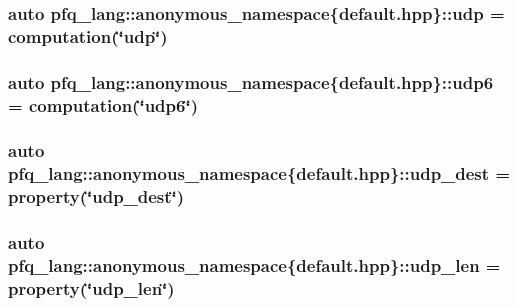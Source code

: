 \hypertarget{namespacepfq__lang_1_1anonymous__namespace_02default_8hpp_03_a1f18de2040dd9d74a07b1c535911abdf}{
\subsubsection[{udp}]{\setlength{\rightskip}{0pt plus 5cm}auto pfq\-\_\-lang\-::anonymous\-\_\-namespace\{default.\-hpp\}\-::udp = {\bf computation}(\char`\"{}udp\char`\"{})}}\label{namespacepfq__lang_1_1anonymous__namespace_02default_8hpp_03_a1f18de2040dd9d74a07b1c535911abdf}
\hypertarget{namespacepfq__lang_1_1anonymous__namespace_02default_8hpp_03_a84b7a888d00d5dfea606f7df96ba0ad3}{
\subsubsection[{udp6}]{\setlength{\rightskip}{0pt plus 5cm}auto pfq\-\_\-lang\-::anonymous\-\_\-namespace\{default.\-hpp\}\-::udp6 = {\bf computation}(\char`\"{}udp6\char`\"{})}}\label{namespacepfq__lang_1_1anonymous__namespace_02default_8hpp_03_a84b7a888d00d5dfea606f7df96ba0ad3}
\hypertarget{namespacepfq__lang_1_1anonymous__namespace_02default_8hpp_03_a4f869214bea58f5ed42b3faded5ab088}{
\subsubsection[{udp\-\_\-dest}]{\setlength{\rightskip}{0pt plus 5cm}auto pfq\-\_\-lang\-::anonymous\-\_\-namespace\{default.\-hpp\}\-::udp\-\_\-dest = {\bf property}(\char`\"{}udp\-\_\-dest\char`\"{})}}\label{namespacepfq__lang_1_1anonymous__namespace_02default_8hpp_03_a4f869214bea58f5ed42b3faded5ab088}
\hypertarget{namespacepfq__lang_1_1anonymous__namespace_02default_8hpp_03_ab0dcf23db0f218100e7fe51562e0add1}{
\subsubsection[{udp\-\_\-len}]{\setlength{\rightskip}{0pt plus 5cm}auto pfq\-\_\-lang\-::anonymous\-\_\-namespace\{default.\-hpp\}\-::udp\-\_\-len = {\bf property}(\char`\"{}udp\-\_\-len\char`\"{})}}\label{namespacepfq__lang_1_1anonymous__namespace_02default_8hpp_03_ab0dcf23db0f218100e7fe51562e0add1}

